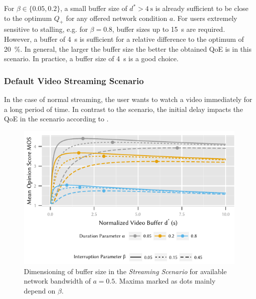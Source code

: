For \(\beta \in \{0.05,0.2\}\), a small buffer size of \(d^*>\SI{4}{\second}\) is already sufficient to be close to the optimum \(Q_+\) for any offered network condition \(a\).
For users extremely sensitive to stalling, e.g. for \(\beta=0.8\), buffer sizes up to \SI{15}{\second} are required.
However, a buffer of \SI{4}{\second} is sufficient for a relative difference to the optimum of \SI{20}{\percent}. 
In general, the larger the buffer size the better the obtained \gls{QoE} is in this scenario. In practice, a buffer size of \SI{4}{\second} is a good choice.

\subsubsection*{Default Video Streaming Scenario}\label{sec:application:qoe_user_behaviour:typical_user_scenarios:default}

In the case of normal streaming, the user wants to watch a video immediately for a long period of time.
In contrast to the \watchLater scenario, the initial delay impacts the \gls{QoE} in the \watchNow scenario according to .

\begin{figure}
  \centering
  \includegraphics{application/qoe_user_behaviour/user_scenarios/figures/default_scenario}
  \caption{Dimensioning of buffer size in the \emph{Streaming Scenario} for available network bandwidth of \(a = 0.5\). Maxima marked as dots mainly depend on \(\beta\).}
  \label{fig:application:qoe_user_behaviour:typical_user_scenarios:default:default_scenario}
\end{figure}

